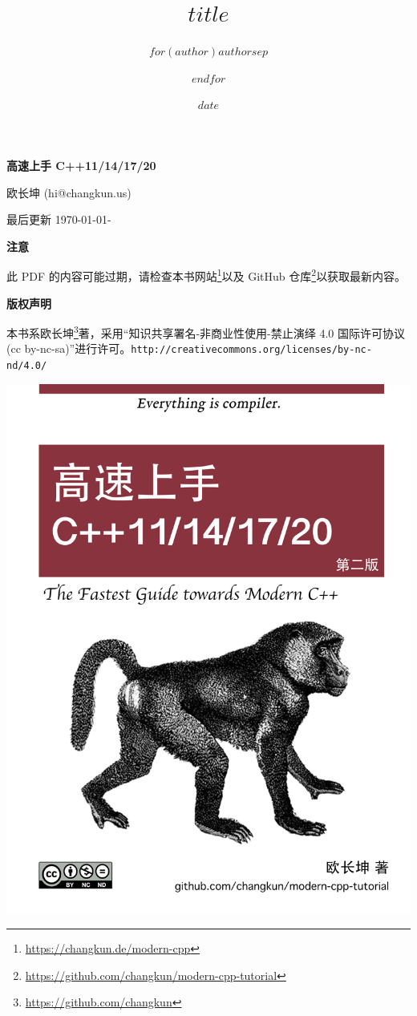 \documentclass[a4paper, 10pt]{ctexart}
\title{$title$}
\author{$for(author)$$author$$sep$ \and $endfor$}
\date{$date$}
\makeatletter
\def\maxwidth{\ifdim\Gin@nat@width>\linewidth\linewidth
\else\Gin@nat@width\fi}
\let\Oldincludegraphics\includegraphics
\renewcommand{\includegraphics}[1]{\Oldincludegraphics[width=0.7\maxwidth]{#1}}
\renewcommand{\href}[2]{#2\footnote{\url{#1}}}
\makeatother
\begin{document}
\newcommand{\tightlist}{%
\setlength{\itemsep}{0pt}\setlength{\parskip}{0pt}}

\thispagestyle{plain}
\begin{center}
  
  {\LARGE\textbf{高速上手 C++11/14/17/20}}
  
  \vspace{1em}
  {\large 欧长坤 (hi@changkun.us)}
  
  \vspace{1ex}
  最后更新 \today - \revision

  \vspace{1ex}
  \textbf{注意}

  \noindent 此 PDF 的内容可能过期，请检查\href{https://changkun.de/modern-cpp}{本书网站}以及 \href{https://github.com/changkun/modern-cpp-tutorial}{GitHub 仓库}以获取最新内容。

  \vspace{1em}
  \textbf{\large 版权声明}

  \noindent 本书系\href{https://github.com/changkun}{欧长坤}著，采用“知识共享署名-非商业性使用-禁止演绎 4.0 国际许可协议 (cc by-nc-sa)”进行许可。\texttt{\small http://creativecommons.org/licenses/by-nc-nd/4.0/}

  \vspace{7em}
  \includegraphics{../../assets/cover-2nd}

\end{center}
\end{document}

